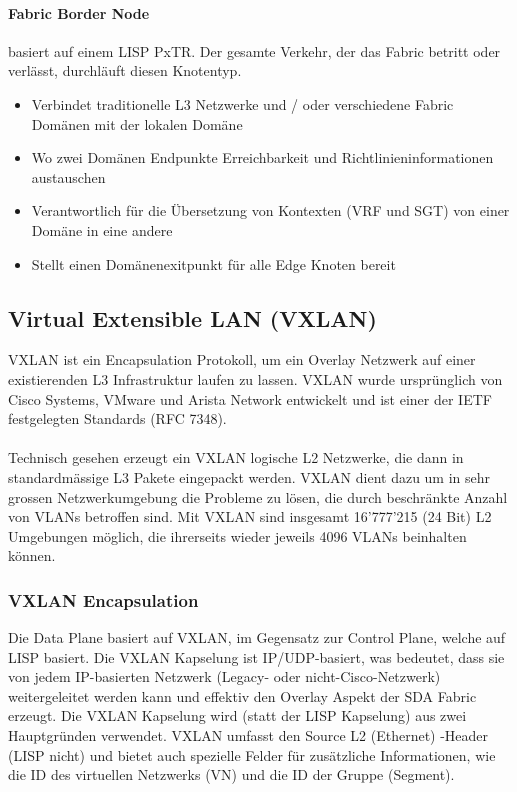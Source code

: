 \paragraph{Fabric Border Node} basiert auf einem LISP PxTR. Der gesamte Verkehr, der das Fabric betritt oder verlässt, durchläuft diesen Knotentyp.
\begin{itemize}
	\item Verbindet traditionelle L3 Netzwerke und / oder verschiedene Fabric Domänen mit der lokalen Domäne
	\item Wo zwei Domänen Endpunkte Erreichbarkeit und Richtlinieninformationen austauschen
	\item Verantwortlich für die Übersetzung von Kontexten (VRF und SGT) von einer Domäne in eine andere
	\item Stellt einen Domänenexitpunkt für alle Edge Knoten bereit
\end{itemize}

\subsection{Virtual Extensible LAN (VXLAN)}
VXLAN ist ein Encapsulation Protokoll, um ein Overlay Netzwerk auf einer existierenden L3 Infrastruktur laufen zu lassen. VXLAN wurde ursprünglich von Cisco Systems, VMware und Arista Network entwickelt und ist einer der IETF festgelegten Standards (RFC 7348). \cite{rfc-7348} \\
\\
Technisch gesehen erzeugt ein VXLAN logische L2 Netzwerke, die dann in standardmässige L3 Pakete eingepackt werden. VXLAN dient dazu um in sehr grossen Netzwerkumgebung die Probleme zu lösen, die durch beschränkte Anzahl von VLANs betroffen sind. Mit VXLAN sind insgesamt 16’777’215 (24 Bit) L2 Umgebungen möglich, die ihrerseits wieder jeweils 4096 VLANs beinhalten können. 

\subsubsection{VXLAN Encapsulation}
Die Data Plane basiert auf VXLAN, im Gegensatz zur Control Plane, welche auf LISP basiert. Die VXLAN Kapselung ist IP/UDP-basiert, was bedeutet, dass sie von jedem IP-basierten Netzwerk (Legacy- oder nicht-Cisco-Netzwerk) weitergeleitet werden kann und effektiv den Overlay Aspekt der SDA Fabric erzeugt. Die VXLAN Kapselung wird (statt der LISP Kapselung) aus zwei Hauptgründen verwendet. VXLAN umfasst den Source L2 (Ethernet) -Header (LISP nicht) und bietet auch spezielle Felder für zusätzliche Informationen, wie die ID des virtuellen Netzwerks (VN) und die ID der Gruppe (Segment). \cite{sda-whitepaper}\\

